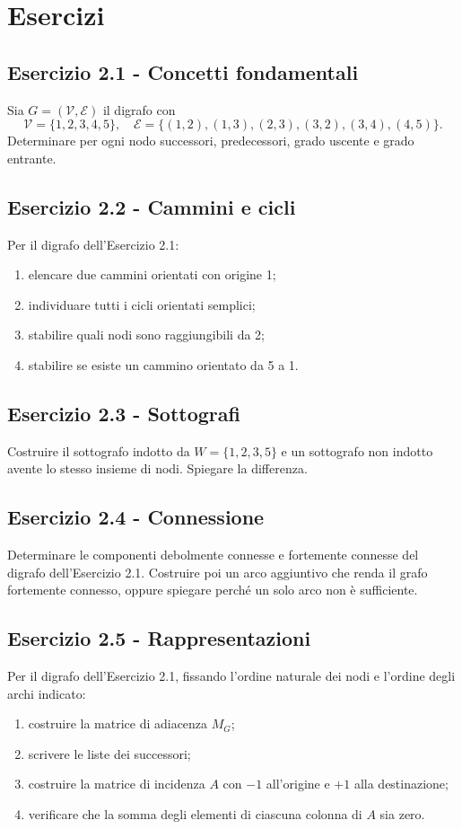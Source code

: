 \documentclass[11pt,a4paper]{article}
\newcommand{\V}{\mathcal{V}}
\newcommand{\E}{\mathcal{E}}
\begin{document}
\section{Esercizi}

\subsection*{Esercizio 2.1 - Concetti fondamentali}
Sia $G=(\V,\E)$ il digrafo con
\[
\V=\{1,2,3,4,5\},\quad
\E=\{(1,2),(1,3),(2,3),(3,2),(3,4),(4,5)\}.
\]
Determinare per ogni nodo successori, predecessori, grado uscente e grado entrante.

\subsection*{Esercizio 2.2 - Cammini e cicli}
Per il digrafo dell'Esercizio 2.1:
\begin{enumerate}[label=(\alph*)]
\item elencare due cammini orientati con origine 1;
\item individuare tutti i cicli orientati semplici;
\item stabilire quali nodi sono raggiungibili da 2;
\item stabilire se esiste un cammino orientato da 5 a 1.
\end{enumerate}

\subsection*{Esercizio 2.3 - Sottografi}
Costruire il sottografo indotto da $W=\{1,2,3,5\}$ e un sottografo non indotto avente lo stesso insieme di nodi. Spiegare la differenza.

\subsection*{Esercizio 2.4 - Connessione}
Determinare le componenti debolmente connesse e fortemente connesse del digrafo dell'Esercizio 2.1. Costruire poi un arco aggiuntivo che renda il grafo fortemente connesso, oppure spiegare perché un solo arco non è sufficiente.

\subsection*{Esercizio 2.5 - Rappresentazioni}
Per il digrafo dell'Esercizio 2.1, fissando l'ordine naturale dei nodi e l'ordine degli archi indicato:
\begin{enumerate}[label=(\alph*)]
\item costruire la matrice di adiacenza $M_G$;
\item scrivere le liste dei successori;
\item costruire la matrice di incidenza $A$ con $-1$ all'origine e $+1$ alla destinazione;
\item verificare che la somma degli elementi di ciascuna colonna di $A$ sia zero.
\end{enumerate}
\end{document}
